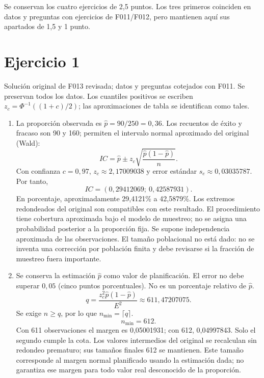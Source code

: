 \documentclass[11pt]{article}
\begin{document}
Se conservan los cuatro ejercicios de 2,5 puntos. Los tres primeros coinciden en datos y preguntas con ejercicios de F011/F012, pero mantienen aquí sus apartados de 1,5 y 1 punto.
\section*{Ejercicio 1}
Solución original de F013 revisada; datos y preguntas cotejados con F011. Se preservan todos los datos. Los cuantiles positivos se escriben $z_c=\Phi^{-1}((1+c)/2)$; las aproximaciones de tabla se identifican como tales.
\begin{enumerate}[label=(\alph*)]\item La proporción observada es $\widehat p=90/250=0,36$. Los recuentos de éxito y fracaso son 90 y 160; permiten el intervalo normal aproximado del original (Wald):
\[IC=\widehat p\pm z_c\sqrt{\frac{\widehat p(1-\widehat p)}{n}}.\]
Con confianza $c=0,97$, $z_c\approx2,17009038$ y error estándar $s_e\approx0,03035787$. Por tanto,
\[IC=\boxed{(0,29412069;\ 0,42587931)}.\]
En porcentaje, aproximadamente 29,4121\% a 42,5879\%. Los extremos redondeados del original son compatibles con este resultado.
El procedimiento tiene cobertura aproximada bajo el modelo de muestreo; no se asigna una probabilidad posterior a la proporción fija. Se supone independencia aproximada de las observaciones. El tamaño poblacional no está dado: no se inventa una corrección por población finita y debe revisarse si la fracción de muestreo fuera importante.
\item Se conserva la estimación $\widehat p$ como valor de planificación. El error no debe superar $0,05$ (cinco puntos porcentuales). No es un porcentaje relativo de $\widehat p$.
\[q=\frac{z_c^2\widehat p(1-\widehat p)}{E^2}\approx611,47207075.\]
Se exige $n\geq q$, por lo que $n_{\min}=\lceil q\rceil$.
\[\boxed{n_{\min}=612}.\]
Con 611 observaciones el margen es 0,05001931; con 612, 0,04997843. Solo el segundo cumple la cota.
Los valores intermedios del original se recalculan sin redondeo prematuro; sus tamaños finales 612 se mantienen. Este tamaño corresponde al margen normal planificado usando la estimación dada; no garantiza ese margen para todo valor real desconocido de la proporción.
\end{enumerate}
\clearpage
\end{document}
